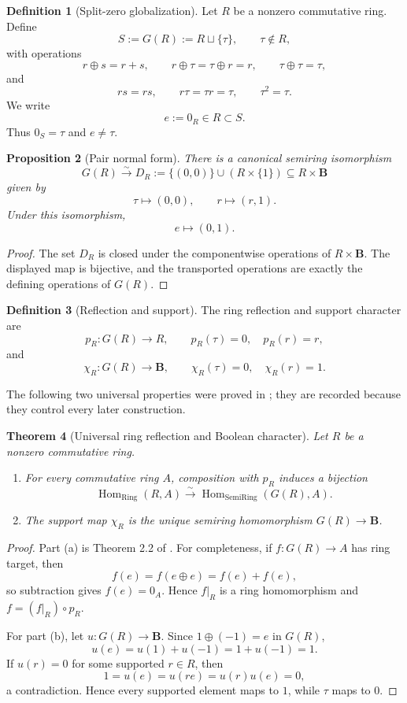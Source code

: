 \documentclass[11pt]{amsart}
\numberwithin{equation}{section}
\newtheorem{theorem}{Theorem}[section]
\newtheorem{proposition}[theorem]{Proposition}
\theoremstyle{definition}
\newtheorem{definition}[theorem]{Definition}
\newcommand{\B}{\mathbf B}
\newcommand{\Hom}{\operatorname{Hom}}
\DeclareMathOperator{\Ring}{Ring}
\DeclareMathOperator{\SemiRing}{SemiRing}
\begin{document}
\begin{definition}[Split-zero globalization]
Let $R$ be a nonzero commutative ring.  Define
\[
S:=G(R):=R\sqcup\{\tau\},
\qquad \tau\notin R,
\]
with operations
\[
r\oplus s=r+s,
\qquad
r\oplus\tau=\tau\oplus r=r,
\qquad
\tau\oplus\tau=\tau,
\]
and
\[
rs=rs,
\qquad
r\tau=\tau r=\tau,
\qquad
\tau^2=\tau.
\]
We write
\[
e:=0_R\in R\subset S.
\]
Thus $0_S=\tau$ and $e\neq\tau$.
\end{definition}

\begin{proposition}[Pair normal form]\label{prop:pair-normal-form}
There is a canonical semiring isomorphism
\[
G(R)\xrightarrow{\sim}
D_R:=\{(0,0)\}\cup(R\times\{1\})
\subseteq R\times\B
\]
given by
\[
\tau\longmapsto(0,0),
\qquad
r\longmapsto(r,1).
\]
Under this isomorphism,
\[
e\longmapsto(0,1).
\]
\end{proposition}

\begin{proof}
The set $D_R$ is closed under the componentwise operations of $R\times\B$.  The displayed map is bijective, and the transported operations are exactly the defining operations of $G(R)$.
\end{proof}

\begin{definition}[Reflection and support]
The ring reflection and support character are
\[
p_R:G(R)\longrightarrow R,
\qquad
p_R(\tau)=0,
\quad
p_R(r)=r,
\]
and
\[
\chi_R:G(R)\longrightarrow\B,
\qquad
\chi_R(\tau)=0,
\quad
\chi_R(r)=1.
\]
\end{definition}

The following two universal properties were proved in \cite{Secondary}; they are recorded because they control every later construction.

\begin{theorem}[Universal ring reflection and Boolean character]\label{thm:universal-maps}
Let $R$ be a nonzero commutative ring.
\begin{enumerate}[label=\textup{(\alph*)}]
\item For every commutative ring $A$, composition with $p_R$ induces a bijection
\[
\Hom_{\Ring}(R,A)
\xrightarrow{\sim}
\Hom_{\SemiRing}(G(R),A).
\]
\item The support map $\chi_R$ is the unique semiring homomorphism $G(R)\to\B$.
\end{enumerate}
\end{theorem}

\begin{proof}
Part (a) is Theorem 2.2 of \cite{Secondary}.  For completeness, if $f:G(R)\to A$ has ring target, then
\[
f(e)=f(e\oplus e)=f(e)+f(e),
\]
so subtraction gives $f(e)=0_A$.  Hence $f|_R$ is a ring homomorphism and $f=(f|_R)\circ p_R$.

For part (b), let $u:G(R)\to\B$.  Since $1\oplus(-1)=e$ in $G(R)$,
\[
u(e)=u(1)+u(-1)=1+u(-1)=1.
\]
If $u(r)=0$ for some supported $r\in R$, then
\[
1=u(e)=u(re)=u(r)u(e)=0,
\]
a contradiction.  Hence every supported element maps to $1$, while $\tau$ maps to $0$.
\end{proof}
\end{document}
